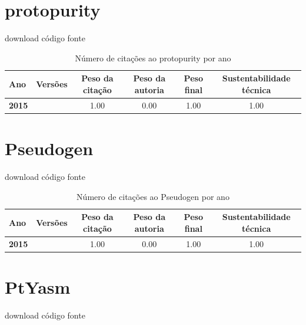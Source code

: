 \section{protopurity}
\checkmark download
\checkmark código fonte


\begin{table}[H]
\caption{Número de citações ao protopurity por ano}
\centering
\begin{tabular}{| l | c | c | c | c | c |}
  \hline
  Ano & Versões & Peso da citação & Peso da autoria & Peso final & Sustentabilidade técnica \\
  \hline
            {\bf 2015}
          &
          
          &
          1.00
          &
          0.00
          &
          1.00
          &
            {\color{blue} 1.00}
          \\
\hline
\end{tabular}
\end{table}



\section{Pseudogen}
\checkmark download
\checkmark código fonte


\begin{table}[H]
\caption{Número de citações ao Pseudogen por ano}
\centering
\begin{tabular}{| l | c | c | c | c | c |}
  \hline
  Ano & Versões & Peso da citação & Peso da autoria & Peso final & Sustentabilidade técnica \\
  \hline
            {\bf 2015}
          &
          
          &
          1.00
          &
          0.00
          &
          1.00
          &
            {\color{blue} 1.00}
          \\
\hline
\end{tabular}
\end{table}



\section{PtYasm}
\checkmark download
\checkmark código fonte


